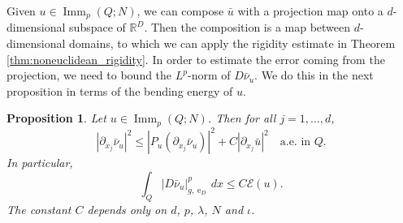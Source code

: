 \documentclass{article}
\numberwithin{equation}{section}
\newtheorem{proposition}[theorem]{Proposition}
\theoremstyle{definition}
\theoremstyle{remark}
\DeclareMathOperator{\e}{e}
\DeclareMathOperator{\Imm}{Imm}
\begin{document}
Given $u \in \Imm_p(Q; N)$, we can compose $\bar{u}$ with a projection map onto a $d$-dimensional subspace of $\mathbb{R}^D$. Then the composition is a map between $d$-dimensional domains, to which we can apply the rigidity estimate in Theorem \ref{thm:noneuclidean_rigidity}. In order to estimate the error coming from the projection, we need to bound the $L^p$-norm of $D\bar{\nu}_u$. We do this in the next proposition in terms of the bending energy of $u$.

\begin{proposition} \label{pr:derivative_normal_estimate}
    Let $u \in \Imm_p(Q; N)$. Then for all $j = 1, \dots, d$,
    \begin{equation} \label{eq:derivative_of_the_normal_bound1}
        |\partial_{x_j} \bar{\nu}_u|^2 \le |P_u(\partial_{x_j} \bar{\nu}_u)|^2 + C |\partial_{x_j} \bar{u}|^2 \quad \text{a.e. in } Q.
    \end{equation}
    In particular,
    \[
    \int_Q |D\bar{\nu}_u|_{g, \e_D}^p \, dx \le C \mathcal{E}(u).
    \]
    The constant $C$ depends only on $d$, $p$, $\lambda$, $N$ and $\iota$.
\end{proposition}
\end{document}
